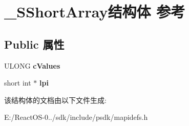 \hypertarget{struct___s_short_array}{}\section{\+\_\+\+S\+Short\+Array结构体 参考}
\label{struct___s_short_array}
\subsection*{Public 属性}
\begin{DoxyCompactItemize}
\item 
\mbox{\label{struct___s_short_array_a031b2a74a968569b3f05a276f1e19784}} 
U\+L\+O\+NG {\bfseries c\+Values}
\item 
\mbox{\label{struct___s_short_array_ae80120883be28054d805824b0b68575f}} 
short int $\ast$ {\bfseries lpi}
\end{DoxyCompactItemize}


该结构体的文档由以下文件生成\+:\begin{DoxyCompactItemize}
\item 
E\+:/\+React\+O\+S-\/0../sdk/include/psdk/mapidefs.\+h\end{DoxyCompactItemize}
